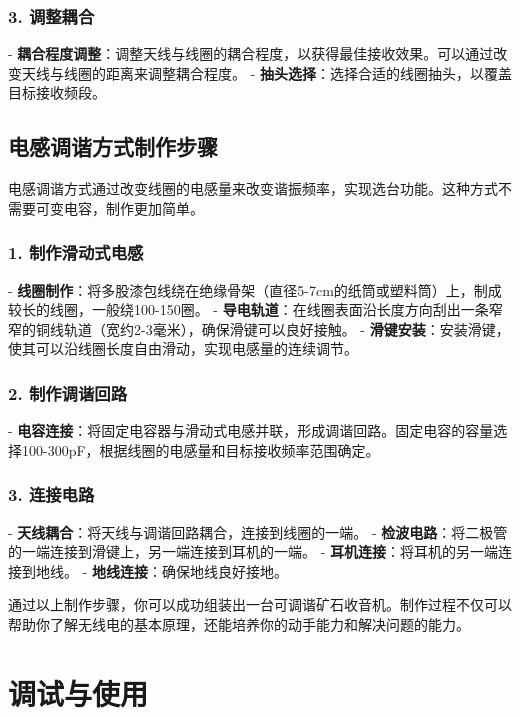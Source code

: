 \documentclass[12pt,UTF8]{ctexbook}
\begin{document}
\subsubsection{3. 调整耦合}

- \textbf{耦合程度调整}：调整天线与线圈的耦合程度，以获得最佳接收效果。可以通过改变天线与线圈的距离来调整耦合程度。
- \textbf{抽头选择}：选择合适的线圈抽头，以覆盖目标接收频段。

\subsection{电感调谐方式制作步骤}

电感调谐方式通过改变线圈的电感量来改变谐振频率，实现选台功能。这种方式不需要可变电容，制作更加简单。

\subsubsection{1. 制作滑动式电感}

- \textbf{线圈制作}：将多股漆包线绕在绝缘骨架（直径5-7cm的纸筒或塑料筒）上，制成较长的线圈，一般绕100-150圈。
- \textbf{导电轨道}：在线圈表面沿长度方向刮出一条窄窄的铜线轨道（宽约2-3毫米），确保滑键可以良好接触。
- \textbf{滑键安装}：安装滑键，使其可以沿线圈长度自由滑动，实现电感量的连续调节。

\subsubsection{2. 制作调谐回路}

- \textbf{电容连接}：将固定电容器与滑动式电感并联，形成调谐回路。固定电容的容量选择100-300pF，根据线圈的电感量和目标接收频率范围确定。

\subsubsection{3. 连接电路}

- \textbf{天线耦合}：将天线与调谐回路耦合，连接到线圈的一端。
- \textbf{检波电路}：将二极管的一端连接到滑键上，另一端连接到耳机的一端。
- \textbf{耳机连接}：将耳机的另一端连接到地线。
- \textbf{地线连接}：确保地线良好接地。

通过以上制作步骤，你可以成功组装出一台可调谐矿石收音机。制作过程不仅可以帮助你了解无线电的基本原理，还能培养你的动手能力和解决问题的能力。
\section{调试与使用}
\end{document}
